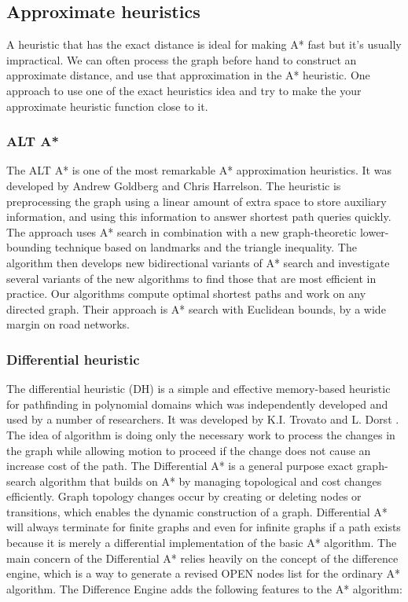 \documentclass[12pt]{article}
\begin{document}
\subsection{Approximate heuristics}
A heuristic that has the exact distance is ideal for making A* fast but it’s usually impractical. We can often process the graph before hand to construct an approximate distance, and use that approximation in the A* heuristic. One approach to use one of the exact heuristics idea and try to make the your approximate heuristic function close to it.

\subsubsection{ALT A*}
The ALT A* is one of the most remarkable A* approximation heuristics. It was developed by Andrew Goldberg and Chris Harrelson\cite{goldberg2005computing}. The heuristic is preprocessing the graph using a linear amount of extra space to store auxiliary information, and using this information to answer shortest path queries quickly. The approach uses A* search in combination with a new graph-theoretic lower-bounding technique based on landmarks and the triangle inequality. The algorithm then develops new bidirectional variants of A* search and investigate several variants of the new algorithms to find those that are most efficient in practice. Our algorithms compute optimal shortest paths and work on any directed graph. Their approach is A* search with Euclidean bounds, by a wide margin on road networks.

\subsubsection{Differential heuristic}
The differential heuristic (DH) is a simple and effective memory-based heuristic for pathfinding in polynomial domains which was independently developed and used by a number of researchers. It was developed by K.I. Trovato and L. Dorst \cite{lv2006numerical} \cite{krishnamurthy2007godzila} \cite{wilson2007swan}. The idea of algorithm is doing only the necessary work to process the changes in the graph while allowing motion to proceed if the change does not cause an increase cost of the path. The Differential A* is a general purpose exact graph-search algorithm that builds on A* by managing topological and cost changes efficiently. Graph topology changes occur by creating or deleting nodes or transitions, which enables the dynamic construction of a graph. Differential A* will always terminate for finite graphs and even for infinite graphs if a path exists because it is merely a differential implementation of the basic A* algorithm. The main concern of the Differential A* relies heavily on the concept of the difference engine, which is a way to generate a revised OPEN nodes list for the ordinary A* algorithm. The Difference Engine adds the following features to the A* algorithm: 
\end{document}
